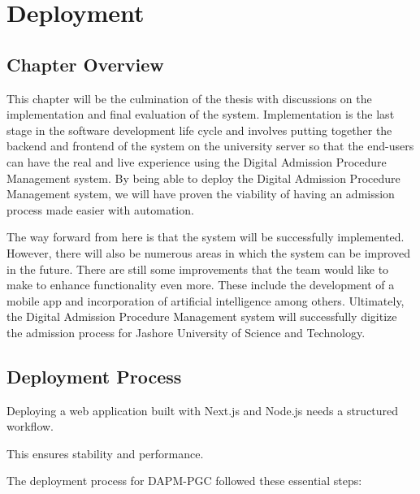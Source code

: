 \chapter{Deployment}

\section{Chapter Overview}

This chapter will be the culmination of the thesis with discussions on the implementation and final evaluation of the system. Implementation is the last stage in the software development life cycle and involves putting together the backend and frontend of the system on the university server so that the end-users can have the real and live experience using the Digital Admission Procedure Management system. By being able to deploy the Digital Admission Procedure Management system, we will have proven the viability of having an admission process made easier with automation.

\noindent The way forward from here is that the system will be successfully implemented. However, there will also be numerous areas in which the system can be improved in the future. There are still some improvements that the team would like to make to enhance functionality even more. These include the development of a mobile app and incorporation of artificial intelligence among others. Ultimately, the Digital Admission Procedure Management system will successfully digitize the admission process for Jashore University of Science and Technology.

\section{Deployment Process}

\noindent Deploying a web application built with Next.js and Node.js needs a structured workflow.

\vspace{0.3cm}

\noindent This ensures stability and performance.

\vspace{0.3cm}

\noindent The deployment process for DAPM-PGC followed these essential steps:

